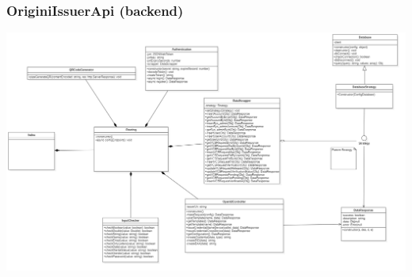 \subsubsection{OriginiIssuerApi (backend)}
\includegraphics[scale=0.25]{./res/img/backendissuer.png}

